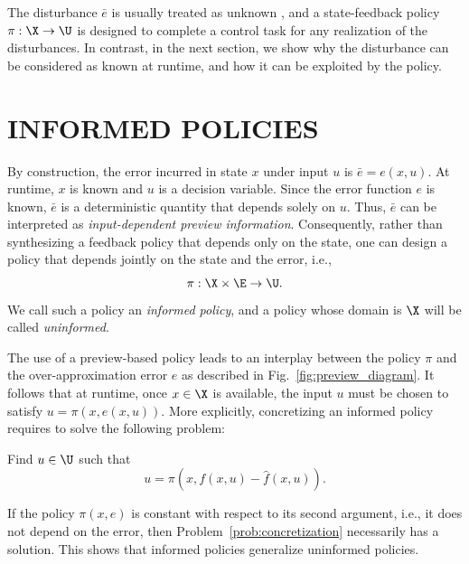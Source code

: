 \documentclass[letterpaper, 10 pt, conference]{ieeeconf}  %
\begin{document}
The disturbance $\bar{e}$ is usually treated as unknown \cite{althoff2008reachability, girard2011synthesis}, and a state-feedback policy $\pi:\X\rightarrow\U$ is designed to complete a control task for any realization of the disturbances. In contrast, in the next section, we show why the disturbance can be considered as known at runtime, and how it can be exploited by the policy.

\section{INFORMED POLICIES}\label{sec:IP}

By construction, the error incurred in state $x$ under input $u$ is $\bar{e}=e(x,u)$. At runtime, $x$ is known and $u$ is a decision variable. Since the error function $e$ is known, $\bar{e}$ is a deterministic quantity that depends solely on $u$. Thus, $\bar{e}$ can be interpreted as \emph{input-dependent preview information}. Consequently, rather than synthesizing a feedback policy that depends only on the state, one can design a policy that depends jointly on the state and the error, i.e.,
$$
\pi:\X\times\E\rightarrow\U.
$$
We call such a policy an \emph{informed policy}, and a policy whose domain is $\X$ will be called \emph{uninformed}.

The use of a preview-based policy leads to an interplay between the policy $\pi$ and the over-approximation error $e$ as described in Fig.~\ref{fig:preview_diagram}. It follows that at runtime, once $x\in\X$ is available, the input $u$ must be chosen to satisfy $u=\pi(x,e(x,u))$. More explicitly, concretizing an informed policy requires to solve the following problem:
\begin{problem}[Concretization]\label{prob:concretization}
Find $u\in\U$ such that
$$
u=\pi(x,f(x,u)-\hat{f}(x,u)).
$$
\end{problem}
If the policy $\pi(x,e)$ is constant with respect to its second argument, i.e., it does not depend on the error, then Problem~\ref{prob:concretization} necessarily has a solution. This shows that informed policies generalize uninformed policies.
\end{document}
